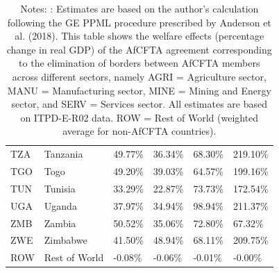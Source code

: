 \begin{table}[htbp]
\begin{tabular}{llllll}
  TZA & Tanzania & 49.77\% & 36.34\% & 68.30\% & 219.10\% \\ 
  TGO & Togo & 49.20\% & 39.03\% & 64.57\% & 199.16\% \\ 
  TUN & Tunisia & 33.29\% & 22.87\% & 73.73\% & 172.54\% \\ 
  UGA & Uganda & 37.97\% & 34.94\% & 98.94\% & 211.37\% \\ 
  ZMB & Zambia & 50.52\% & 35.06\% & 72.80\% & 67.32\% \\ 
  ZWE & Zimbabwe & 41.50\% & 48.94\% & 68.11\% & 209.75\% \\ 
  ROW & Rest of World & -0.08\% & -0.06\% & -0.01\% & -0.00\% \\ 
   \hline  \hline
\end{tabular}
\endgroup
\caption*{Notes: : Estimates are based on the author’s calculation following the GE PPML procedure prescribed by Anderson et al. (2018). This table shows the welfare effects (percentage change in real GDP) of the AfCFTA agreement corresponding to the elimination of borders between AfCFTA members across different sectors, namely AGRI = Agriculture sector, MANU = Manufacturing sector, MINE = Mining and Energy sector, and SERV = Services sector. All estimates are based on ITPD-E-R02 data. ROW = Rest of World (weighted average for non-AfCFTA countries).}
\end{table}

